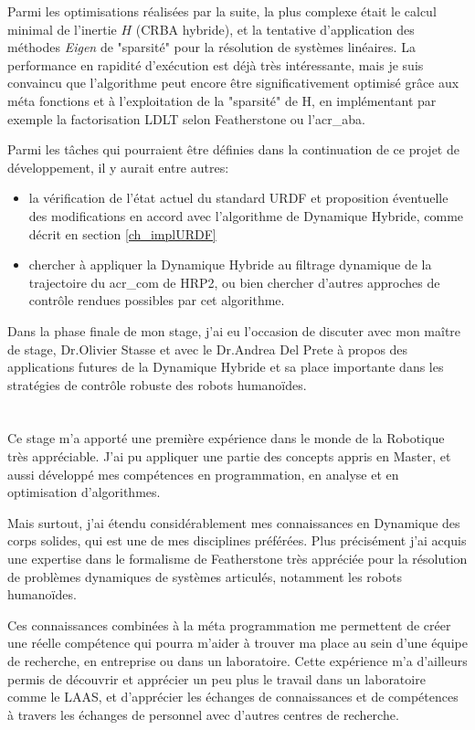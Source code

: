 \documentclass{report}
\begin{document}
Parmi les optimisations réalisées par la suite, la plus complexe était le calcul minimal de l'inertie $H$ (CRBA hybride), et la tentative d'application des méthodes \emph{Eigen} de "sparsité" pour la résolution de systèmes linéaires. La performance en rapidité d'exécution est déjà très intéressante, mais je suis convaincu que l'algorithme peut encore être significativement optimisé grâce aux méta fonctions et à l'exploitation de la "sparsité" de H, en implémentant par exemple la factorisation LDLT selon Featherstone ou l'\gls{acr_aba}.

Parmi les tâches qui pourraient être définies dans la continuation de ce projet de développement, il y aurait entre autres:
\begin{itemize}
\item la vérification de l'état actuel du standard URDF et proposition éventuelle des modifications en accord avec l'algorithme de Dynamique Hybride, comme décrit en section \ref{ch_implURDF}
\item chercher à appliquer la Dynamique Hybride au filtrage dynamique de la trajectoire du \gls{acr_com} de HRP2, ou bien chercher d'autres approches de contrôle rendues possibles par cet algorithme.
\end{itemize}

Dans la phase finale de mon stage, j'ai eu l'occasion de discuter avec mon maître de stage, Dr.Olivier Stasse et avec le Dr.Andrea Del Prete à propos des applications futures de la Dynamique Hybride et sa place importante dans les stratégies de contrôle robuste des robots humanoïdes.


\section*{} %

Ce stage m'a apporté une première expérience dans le monde de la Robotique très appréciable. J'ai pu appliquer une partie des concepts appris en Master, et aussi développé mes compétences en programmation, en analyse et en optimisation d'algorithmes.

Mais surtout, j'ai étendu considérablement mes connaissances en Dynamique des corps solides, qui est une de mes disciplines préférées. Plus précisément  j'ai acquis une expertise dans le formalisme de Featherstone très appréciée pour la résolution de problèmes dynamiques de systèmes articulés, notamment les robots humanoïdes.

Ces connaissances combinées à la méta programmation me permettent de créer une réelle compétence qui pourra m'aider à trouver ma place au sein d'une équipe de recherche, en entreprise ou dans un laboratoire. Cette expérience m'a d'ailleurs permis de découvrir et apprécier un peu plus le travail dans un laboratoire comme le LAAS, et d'apprécier les échanges de connaissances et de compétences à travers les échanges de personnel avec d'autres centres de recherche.
\end{document}

